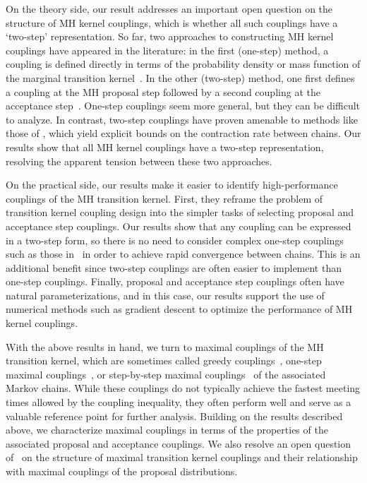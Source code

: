 \documentclass[aihp]{imsart}
\theoremstyle{plain}
\theoremstyle{remark}
\theoremstyle{definition} \newtheorem{example}{Example}
\begin{document}
On the theory side, our result addresses an important open question on the structure of MH kernel
couplings, which is whether all such couplings have a `two-step' representation. So far, two
approaches to constructing MH kernel couplings have appeared in the literature: in the first
(one-step) method, a coupling is defined directly in terms of the probability density or mass
function of the marginal transition kernel~\citep{rosenthal1996analysis, rosenthal2002quantitative,
	qin2018wasserstein, OLeary2020}. In the other (two-step) method, one first defines a coupling at the
MH proposal step followed by a second coupling at the acceptance step~\citep{johnson1998coupling,
	bou2018coupling, Jacob2020}. One-step couplings seem more general, but they can be difficult to
analyze. In contrast, two-step couplings have proven amenable to methods like those of
\citet{bou2018coupling}, which yield explicit bounds on the contraction rate between chains. Our
results show that all MH kernel couplings have a two-step representation, resolving the apparent
tension between these two approaches.

On the practical side, our results make it easier to identify high-performance couplings of the MH
transition kernel. First, they reframe the problem of transition kernel coupling design into the
simpler tasks of selecting proposal and acceptance step couplings. Our results show that any
coupling can be expressed in a two-step form, so there is no need to consider complex one-step
couplings such as those in~\citet{o2021couplings} in order to achieve rapid convergence between chains. This
is an additional benefit since two-step couplings are often easier to implement than one-step
couplings. Finally, proposal and acceptance step couplings often have natural parameterizations, and
in this case, our results support the use of numerical methods such as gradient descent to optimize
the performance of MH kernel couplings.

With the above results in hand, we turn to maximal couplings of the MH transition kernel, which are
sometimes called greedy couplings~\citep{aldous1995reversible, hayes2005general}, one-step maximal
couplings~\citep{reutter1995general, hayes2003non, kartashov2013maximal}, or step-by-step maximal
couplings~\citep{pillai2019mixing} of the associated Markov chains. While these couplings do not
typically achieve the fastest meeting times allowed by the coupling inequality, they often perform
well and serve as a valuable reference point for further analysis. Building on the results described
above, we characterize maximal couplings in terms of the properties of the associated proposal and
acceptance couplings. We also resolve an open question of~\citet{OLeary2020} on the structure of
maximal transition kernel couplings and their relationship with maximal couplings of the proposal
distributions.
\end{document}
